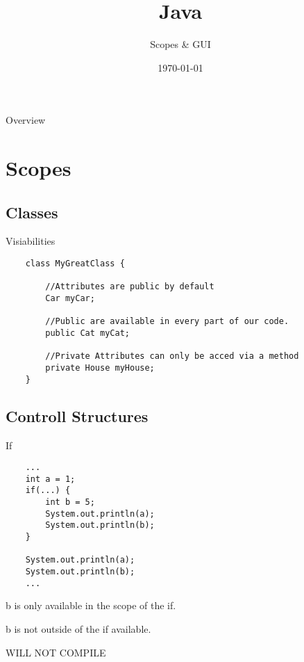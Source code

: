 


\title{Java}
\subtitle{Scopes \& GUI}
\date{\today}



\begin{frame}
\titlepage
\end{frame}

\begin{frame}{Overview}
\tableofcontents
\end{frame}

\section{Scopes}
\subsection{Classes}

\begin{frame}[fragile]{Visiabilities}
    \begin{lstlisting}
    class MyGreatClass {
    
        //Attributes are public by default
        Car myCar; 
    
        //Public are available in every part of our code.
        public Cat myCat;
        
        //Private Attributes can only be acced via a method
        private House myHouse;
    }\end{lstlisting}
\end{frame}

\subsection{Controll Structures}
\begin{frame}[fragile]{If}
    \begin{lstlisting}
    ...
    int a = 1;
    if(...) {
        int b = 5;
        System.out.println(a);
        System.out.println(b);
    }
    
    System.out.println(a);
    System.out.println(b);
    ...\end{lstlisting}
    
    b is only available in the scope of the if.
    
    b is not outside of the if available.
    
    \color{red} WILL NOT COMPILE
\end{frame}

